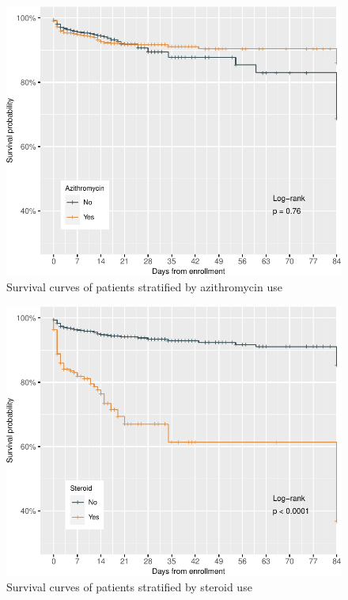 \documentclass[
  10pt,
]{article}
\begin{document}
\newpage
\begin{figure}[h]

{\centering \includegraphics{results_files/figure-latex/azithromycin-1} 

}

\caption{Survival curves of patients stratified by azithromycin use}\label{fig:azithromycin}
\end{figure}

\newpage
\begin{figure}[h]

{\centering \includegraphics{results_files/figure-latex/steroid-1} 

}

\caption{Survival curves of patients stratified by steroid use}\label{fig:steroid}
\end{figure}
\end{document}
